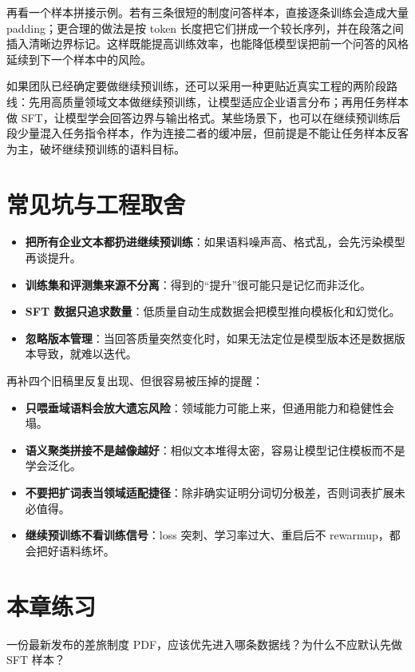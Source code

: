 再看一个样本拼接示例。若有三条很短的制度问答样本，直接逐条训练会造成大量 padding；更合理的做法是按 token 长度把它们拼成一个较长序列，并在段落之间插入清晰边界标记。这样既能提高训练效率，也能降低模型误把前一个问答的风格延续到下一个样本中的风险。

如果团队已经确定要做继续预训练，还可以采用一种更贴近真实工程的两阶段路线：先用高质量领域文本做继续预训练，让模型适应企业语言分布；再用任务样本做 SFT，让模型学会回答边界与输出格式。某些场景下，也可以在继续预训练后段少量混入任务指令样本，作为连接二者的缓冲层，但前提是不能让任务样本反客为主，破坏继续预训练的语料目标。

\section{常见坑与工程取舍}
\begin{itemize}
  \item \textbf{把所有企业文本都扔进继续预训练}：如果语料噪声高、格式乱，会先污染模型再谈提升。
  \item \textbf{训练集和评测集来源不分离}：得到的“提升”很可能只是记忆而非泛化。
  \item \textbf{SFT 数据只追求数量}：低质量自动生成数据会把模型推向模板化和幻觉化。
  \item \textbf{忽略版本管理}：当回答质量突然变化时，如果无法定位是模型版本还是数据版本导致，就难以迭代。
\end{itemize}

再补四个旧稿里反复出现、但很容易被压掉的提醒：
\begin{itemize}
  \item \textbf{只喂垂域语料会放大遗忘风险}：领域能力可能上来，但通用能力和稳健性会塌。
  \item \textbf{语义聚类拼接不是越像越好}：相似文本堆得太密，容易让模型记住模板而不是学会泛化。
  \item \textbf{不要把扩词表当领域适配捷径}：除非确实证明分词切分极差，否则词表扩展未必值得。
  \item \textbf{继续预训练不看训练信号}：loss 突刺、学习率过大、重启后不 rewarmup，都会把好语料练坏。
\end{itemize}

\section{本章练习}
\begin{exercise}[样本去向判断]
一份最新发布的差旅制度 PDF，应该优先进入哪条数据线？为什么不应默认先做 SFT 样本？
\end{exercise}

